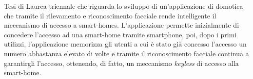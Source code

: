 \abstract
Tesi di Laurea triennale che riguarda lo sviluppo di un'applicazione di domotica che tramite il rilevamento e riconoscimento facciale rende intelligente il meccanismo di accesso a smart-homes. L'applicazione permette inizialmente di concedere l'accesso ad una smart-home tramite smartphone, poi, dopo i primi utilizzi, l'applicazione memorizza gli utenti a cui è stato già concesso l'accesso un numero abbastanza elevato di volte e tramite il riconoscimento facciale continua a garantirgli l'accesso, ottenendo, di fatto, un meccanismo \textit{keyless} di accesso alla smart-home.